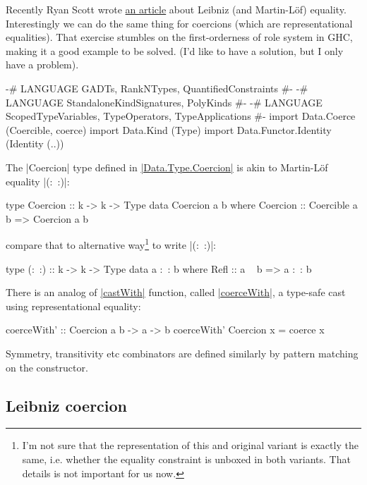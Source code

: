 Recently Ryan Scott wrote \href{https://ryanglscott.github.io/2021/08/22/leibniz-equality-in-haskell-part-1/}{an article} about
Leibniz (and Martin-Löf) equality.
Interestingly we can do the same thing for coercions (which are representational equalities).
That exercise stumbles on the first-orderness of role system in GHC,
making it a good example to be solved.
(I'd like to have a solution, but I only have a problem).
\begin{code}
{-# LANGUAGE GADTs, RankNTypes, QuantifiedConstraints #-}
{-# LANGUAGE StandaloneKindSignatures, PolyKinds #-}
{-# LANGUAGE ScopedTypeVariables, TypeOperators, TypeApplications #-}
import Data.Coerce (Coercible, coerce)
import Data.Kind (Type)
import Data.Functor.Identity (Identity (..))
\end{code}

The |Coercion| type defined in \href{https://hackage.haskell.org/package/base-4.15.0.0/docs/Data-Type-Coercion.html}{|Data.Type.Coercion|} is akin to Martin-Löf
equality |(:~:)|:

\begin{code}
type Coercion :: k -> k -> Type
data Coercion a b where
  Coercion :: Coercible a b => Coercion a b
\end{code}

compare that to alternative way\footnote{
I'm not sure that the representation of this and original variant is exactly the same,
i.e. whether the equality constraint is unboxed in both variants.
That details is not important for us now.
} to write |(:~:)|:
\begin{code}
type (:~:) :: k -> k -> Type
data a :~: b where
  Refl :: a ~ b => a :~: b
\end{code}

There is an analog of \href{https://hackage.haskell.org/package/base-4.15.0.0/docs/Data-Type-Equality.html#v:castWith}{|castWith|} function,
called \href{https://hackage.haskell.org/package/base-4.15.0.0/docs/Data-Type-Coercion.html#v:coerceWith}{|coerceWith|},
a type-safe cast using representational equality:
\begin{code}
coerceWith' :: Coercion a b -> a -> b
coerceWith' Coercion x = coerce x
\end{code}

Symmetry, transitivity etc combinators are defined similarly by pattern
matching on the constructor.

\subsection{Leibniz coercion}

